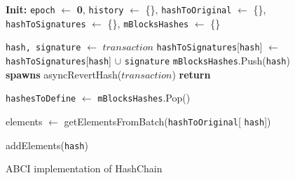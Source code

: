 \begin{figure}[t!]
  \begin{adjustbox}{minipage=[t]{\columnwidth}}
    \begin{algorithm}[H]
      \renewcommand{\thealgorithm}{First Seen Consolidation}         
      \caption{\small ABCI implementation of HashChain}%
      \label{alg:abci-hash-first-seen}%
      \small
      \begin{algorithmic}[1]
            \State \textbf{Init:} \texttt{epoch} $\leftarrow$ \textbf{0}, \texttt{history} $\leftarrow$ \{\}, \texttt{hashToOriginal} $\leftarrow$ \{\}, \texttt{hashToSignatures} $\leftarrow$ \{\}, \texttt{mBlocksHashes} $\leftarrow$ \{\}
      
            \label{alg4:deliver_tx}
            		\State \texttt{hash, signature} $\leftarrow$ $transaction$
            		\State \texttt{hashToSignatures}[\texttt{hash}] $\leftarrow$ \texttt{hashToSignatures}[\texttt{hash}] $\cup$  \texttt{signature}
					\State \texttt{mBlocksHashes}.Push(\texttt{hash}) 
            		\EndIf
            			\State \textbf{spawns} asyncRevertHash($transaction$)
                	\EndIf
                \State \textbf{return}
            \EndFunction
            
            		\State \texttt{hashesToDefine} $\leftarrow$ \texttt{mBlocksHashes}.Pop()
            				
            						\State elements $\leftarrow$ getElementsFromBatch(\texttt{hashToOriginal}[ \texttt{hash}])
            		
            						\State addElements(\texttt{hash})
            					\EndIf
            				\Else
            				\EndIf
					\Else
            			\EndIf
            		\EndFor
            \EndFunction
            
        \end{algorithmic}
      \end{algorithm}
	\end{adjustbox}
  \end{figure}

